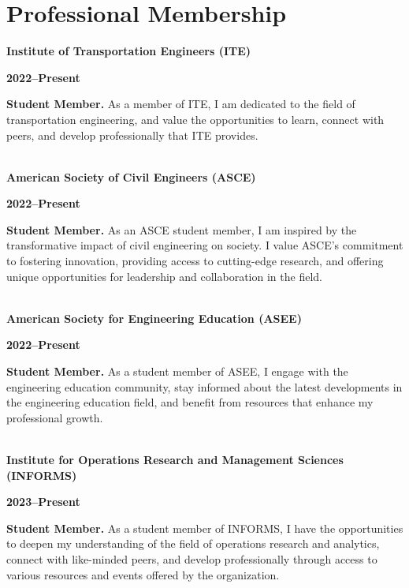 \documentclass[a4paper,11pt]{article}
\begin{document}
\section{Professional Membership}
\begin{flushleft}
\textcolor{mycolor}{\textbf{Institute of Transportation Engineers (ITE)}}\\
\parbox[t]{2.5cm}{\textbf{2022--Present}}%
\parbox[t]{\dimexpr\textwidth-2.5cm\relax}{%
\textbf{Student Member.} As a member of ITE, I am dedicated to the field of transportation engineering, and value the opportunities to learn, connect with peers, and develop professionally that ITE provides.}\\[0.5em]

\textcolor{mycolor}{\textbf{American Society of Civil Engineers (ASCE)}}\\
\parbox[t]{2.5cm}{\textbf{2022--Present}}%
\parbox[t]{\dimexpr\textwidth-2.5cm\relax}{%
\textbf{Student Member.} As an ASCE student member, I am inspired by the transformative impact of civil engineering on society. I value ASCE's commitment to fostering innovation, providing access to cutting-edge research, and offering unique opportunities for leadership and collaboration in the field.}\\[0.5em]

\textcolor{mycolor}{\textbf{American Society for Engineering Education (ASEE)}}\\
\parbox[t]{2.5cm}{\textbf{2022--Present}}%
\parbox[t]{\dimexpr\textwidth-2.5cm\relax}{%
\textbf{Student Member.} As a student member of ASEE, I engage with the engineering education community, stay informed about the latest developments in the engineering education field, and benefit from resources that enhance my professional growth.}\\[0.5em]

\textcolor{mycolor}{\textbf{Institute for Operations Research and Management Sciences (INFORMS)}}\\
\parbox[t]{2.5cm}{\textbf{2023--Present}}%
\parbox[t]{\dimexpr\textwidth-2.5cm\relax}{%
\textbf{Student Member.} As a student member of INFORMS, I have the opportunities to deepen my understanding of the field of operations research and analytics, connect with like-minded peers, and develop professionally through access to various resources and events offered by the organization.}\\[0.5em]

\end{flushleft}
\end{document}
